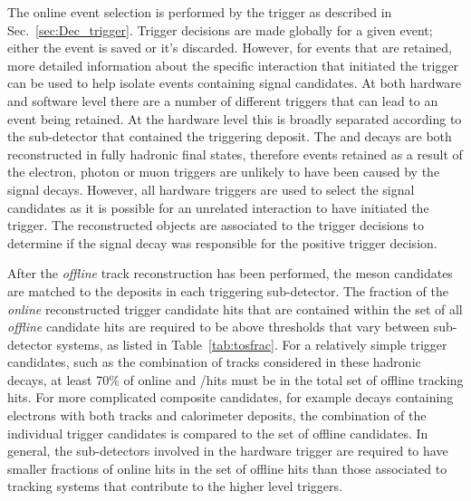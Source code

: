 The online event selection is performed by the \lhcb trigger as described in Sec.~\ref{sec:Dec_trigger}.
Trigger decisions are made globally for a given event; either the event is saved or it's discarded. However, for events that are retained, more detailed information about the specific interaction that initiated the trigger can be used to help isolate events containing signal candidates. At both hardware and software level there are a number of different triggers that can lead to an event being retained. At the hardware level this is broadly separated according to the sub-detector that contained the triggering deposit. 
The \decay{\Bp}{\Dsp\Kp\Km} and \decay{\Bp}{\Dsp}{\phiz} decays are both reconstructed in fully hadronic final states, therefore events retained as a result of the electron, photon or muon triggers are unlikely to have been caused by the signal decays. However, all hardware triggers are used to select the signal candidates as it is possible for an unrelated interaction to have initiated the trigger. The reconstructed objects are associated to the trigger decisions to determine if the signal decay was responsible for the positive trigger decision.

After the \emph{offline} track reconstruction has been performed, the \Bp meson candidates are matched to the deposits in each triggering sub-detector.
The fraction of the \emph{online} reconstructed trigger candidate hits that are contained within the set of all \emph{offline} \Bp candidate hits are required to be above thresholds that vary between sub-detector systems, as listed in Table~\ref{tab:tosfrac}. 
For a relatively simple trigger candidates, such as the combination of tracks considered in these hadronic decays, at least 70\% of online \velo and \intr/\ot hits must be in the total set of offline tracking hits. For more complicated composite candidates, for example decays containing electrons with both tracks and calorimeter deposits, the combination of the individual trigger candidates is compared to the set of offline candidates.  
In general, the sub-detectors involved in the hardware trigger are required to have smaller fractions of online hits in the set of offline hits than those associated to tracking systems that contribute to the higher level triggers.  

